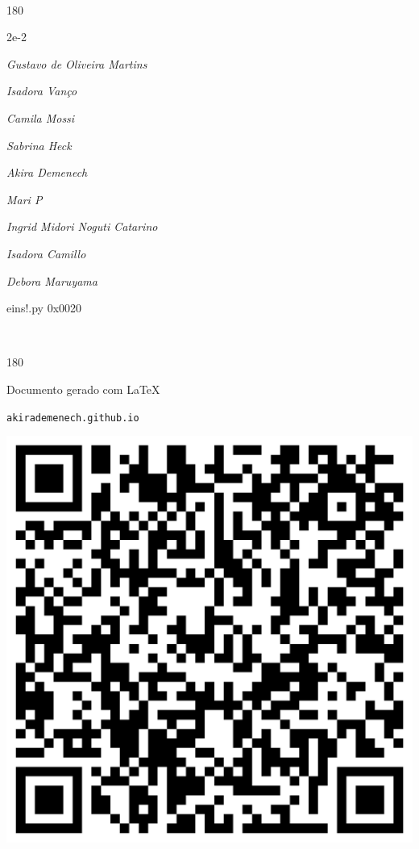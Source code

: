 \documentclass[12pt]{article}
\begin{document}
		  

\pagebreak			

	\ 
	\vfill
	\begin{turn}{180}	
		\begin{minipage}{\textwidth}
		  	\ttfamily %
			\centering
			{\Huge 2e-2}
		  
			\hfill
		  
			

\textit{\small Gustavo de Oliveira Martins}

\textit{\small Isadora Vanço}

\textit{\small Camila Mossi}

\textit{\small Sabrina Heck}

\textit{\small Akira Demenech}

\textit{\small Mari P}

\textit{\small Ingrid Midori Noguti Catarino}

\textit{\small Isadora Camillo}

\textit{\small Debora Maruyama}

\bigskip

eins!.py
0x0020


		\end{minipage}	
	\end{turn}
	\vfill
	\

\pagebreak

	\begin{turn}{180}	
		\begin{minipage}{\textwidth}		  
		  Documento gerado com \LaTeX			
		  
		  \texttt{akirademenech.github.io}

		  \includegraphics[height=0.3\textheight]{2e-2.pdf}

		\end{minipage}	
	\end{turn}  
		  
\end{document}

